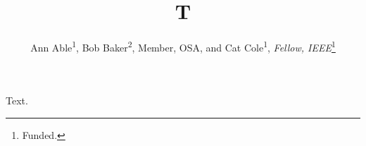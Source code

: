 \documentclass{IEEEtran}
\begin{document}
\title{T}
\author{Ann Able\textsuperscript{1}, Bob Baker\textsuperscript{2}, Member, OSA, and Cat Cole\textsuperscript{1}, \textit{Fellow, IEEE}\thanks{Funded.} \\
}
\maketitle
Text.
\end{document}
